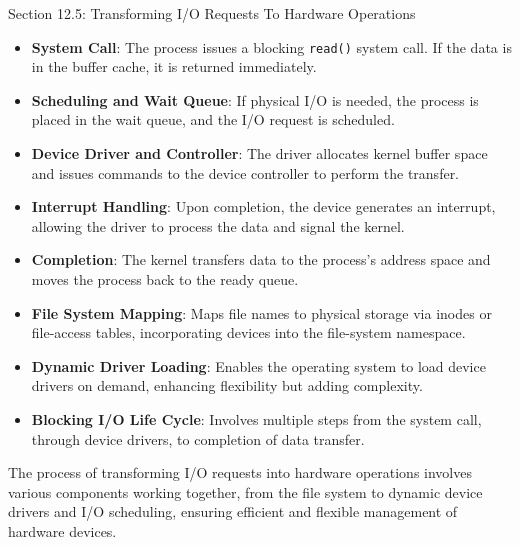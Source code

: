 \begin{notes}{Section 12.5: Transforming I/O Requests To Hardware Operations}
\begin{highlight}
        \begin{itemize}
            \item \textbf{System Call}: The process issues a blocking \texttt{read()} system call. If the data is in the buffer cache, it is returned immediately.
            \item \textbf{Scheduling and Wait Queue}: If physical I/O is needed, the process is placed in the wait queue, and the I/O request is scheduled.
            \item \textbf{Device Driver and Controller}: The driver allocates kernel buffer space and issues commands to the device controller to perform the transfer.
            \item \textbf{Interrupt Handling}: Upon completion, the device generates an interrupt, allowing the driver to process the data and signal the kernel.
            \item \textbf{Completion}: The kernel transfers data to the process’s address space and moves the process back to the ready queue.
        \end{itemize}
    
    \end{highlight}
    
    \begin{highlight}
    
        \begin{itemize}
            \item \textbf{File System Mapping}: Maps file names to physical storage via inodes or file-access tables, incorporating devices into the file-system namespace.
            \item \textbf{Dynamic Driver Loading}: Enables the operating system to load device drivers on demand, enhancing flexibility but adding complexity.
            \item \textbf{Blocking I/O Life Cycle}: Involves multiple steps from the system call, through device drivers, to completion of data transfer.
        \end{itemize}
    
    The process of transforming I/O requests into hardware operations involves various components working together, from the file system to dynamic device drivers and I/O scheduling, ensuring efficient 
    and flexible management of hardware devices.
    
    \end{highlight}
\end{notes}

